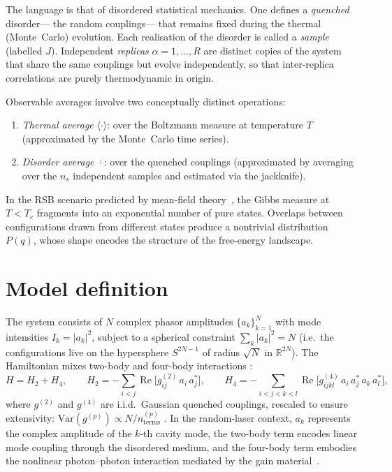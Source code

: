 \documentclass[11pt,a4paper]{article}
\newcommand{\avg}[1]{\langle #1 \rangle}
\newcommand{\avgJ}[1]{\overline{#1}}
\newcommand{\re}{\operatorname{Re}}
\begin{document}
The language is that of disordered statistical mechanics.
One defines a \emph{quenched} disorder--- the random couplings---
that remains fixed during the thermal (Monte~Carlo) evolution.
Each realisation of the disorder is called a \emph{sample} (labelled
$J$).  Independent \emph{replicas} $\alpha = 1,\ldots,R$ are
distinct copies of the system that share the same couplings but
evolve independently, so that inter-replica correlations are purely
thermodynamic in origin.

Observable averages involve two conceptually distinct operations:
\begin{enumerate}[nosep]
\item \emph{Thermal average} $\avg{\cdot}$: over the Boltzmann measure
  at temperature $T$ (approximated by the Monte~Carlo time series).
\item \emph{Disorder average} $\avgJ{\cdot}$: over the quenched
  couplings (approximated by averaging over the $n_s$ independent
  samples and estimated via the jackknife).
\end{enumerate}
In the RSB scenario predicted by mean-field
theory~\cite{Parisi1979,MPV1987}, the Gibbs measure at $T<T_c$
fragments into an exponential number of pure states.
Overlaps between configurations drawn from different states produce a
nontrivial distribution $P(q)$, whose shape encodes the structure of
the free-energy landscape.

\section{Model definition}\label{sec:model}

The system consists of $N$ complex phasor amplitudes
$\{a_k\}_{k=1}^{N}$ with mode intensities $I_k = |a_k|^2$,
subject to a spherical constraint $\sum_k |a_k|^2 = N$
(i.e.\ the configurations live on the hypersphere $S^{2N-1}$
of radius $\sqrt{N}$ in $\mathbb{R}^{2N}$).
The Hamiltonian mixes two-body and four-body interactions
\cite{Antenucci2015a}:
\begin{equation}\label{eq:hamiltonian}
  H = H_2 + H_4,\qquad
  H_2 = -\sum_{i<j} \re\bigl[g_{ij}^{(2)}\, a_i\, a_j^*\bigr],\qquad
  H_4 = -\sum_{i<j<k<l} \re\bigl[g_{ijkl}^{(4)}\, a_i\, a_j^*\, a_k\, a_l^*\bigr],
\end{equation}
where $g^{(2)}$ and $g^{(4)}$ are i.i.d.\ Gaussian quenched
couplings, rescaled to ensure extensivity:
$\mathrm{Var}(g^{(p)}) \propto N / n_{\mathrm{terms}}^{(p)}$
\cite{Antenucci2015a}.  In the random-laser context, $a_k$
represents the complex amplitude of the $k$-th cavity mode, the
two-body term encodes linear mode coupling through the disordered
medium, and the four-body term embodies the nonlinear photon--photon
interaction mediated by the gain
material~\cite{Leuzzi2009,Angelani2006}.
\end{document}
